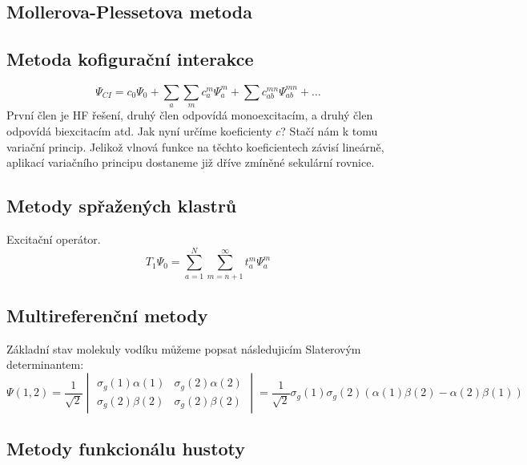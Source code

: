 
\subsection{Mollerova-Plessetova metoda}


\subsection{Metoda kofigurační interakce}

\begin{equation}
\Psi_{CI}=c_0\Psi_0+\sum_a\sum_m c_a^m\Psi_a^m+\sum c_{ab}^{mn}\Psi_{ab}^{mn}+\dots
\end{equation}
První člen je HF řešení, druhý člen odpovídá monoexcitacím, a druhý člen odpovídá biexcitacím atd.
Jak nyní určíme koeficienty $c$? Stačí nám k tomu variační princip. Jelikož vlnová funkce na těchto koeficientech závisí lineárně,
aplikací variačního principu dostaneme již dříve zmíněné sekulární rovnice.


\subsection{Metody spřažených klastrů}

Excitační operátor.
\begin{equation}
T_1\Psi_0=\sum^N_{a=1}\sum_{m=n+1}^\infty t_a^m\Psi_a^m
\end{equation}

\subsection{Multireferenční metody}

Základní stav molekuly vodíku můžeme popsat následujicím Slaterovým determinantem:
\begin{equation}
\Psi (1,2)=\frac{1}{\sqrt{2}}
\begin{vmatrix}
\sigma_g(1)\alpha (1) & \sigma_g(2)\alpha (2) \\
\sigma_g(2)\beta (2) & \sigma_g(2)\beta (2)
\end{vmatrix}
=\frac{1}{\sqrt{2}}\sigma_g(1)\sigma_g(2)(\alpha (1)\beta (2)-\alpha (2)\beta (1))
\end{equation}

\subsection{Metody funkcionálu hustoty}


